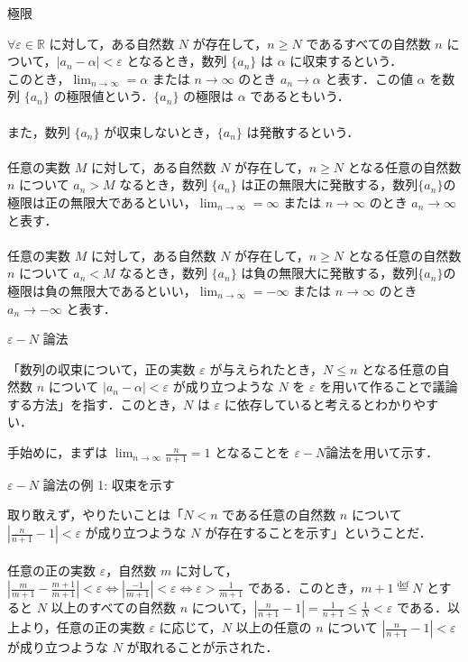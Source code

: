 \documentclass[a4paper]{ltjsarticle}
\begin{document}
\begin{tcb}{極限}{}

$\forall \varepsilon \in \mathbb{R}$ に対して，ある自然数 $N$ が存在して，$n \geq N$ であるすべての自然数 $n$ について，$|a_n - \alpha| < \varepsilon$ となるとき，数列 $\{a_n\}$ は $\alpha$ に収束するという．\\
このとき，$\lim_{n \to \infty} = \alpha$ または $n \to \infty$ のとき $a_n \to \alpha$ と表す．この値 $\alpha$ を数列 $\{a_n\}$ の極限値という．$\{a_n\}$ の極限は $\alpha$ であるともいう．\\
\\
また，数列 $\{a_n\}$ が収束しないとき，$\{a_n\}$ は発散するという．\\
\\
任意の実数 $M$ に対して，ある自然数 $N$ が存在して，$n \geq N$ となる任意の自然数 $n$ について $a_n > M$ なるとき，数列 $\{a_n\}$ は正の無限大に発散する，数列$\{a_n\}$の極限は正の無限大であるといい，$\lim_{n \to \infty} = \infty$ または $n \to \infty$ のとき $a_n \to \infty$ と表す．\\
\\
任意の実数 $M$ に対して，ある自然数 $N$ が存在して，$n \geq N$ となる任意の自然数 $n$ について $a_n < M$ なるとき，数列 $\{a_n\}$ は負の無限大に発散する，数列$\{a_n\}$の極限は負の無限大であるといい，$\lim_{n \to \infty} = -\infty$ または $n \to \infty$ のとき $a_n \to -\infty$ と表す．

\end{tcb}

\begin{tcb}{$\varepsilon - N$ 論法}{}

「数列の収束について，正の実数 $\varepsilon$ が与えられたとき，$N \leq n$ となる任意の自然数 $n$ について $|a_n - \alpha| < \varepsilon$ が成り立つような $N$ を $\varepsilon$ を用いて作ることで議論する方法」を指す．このとき，$N$ は $\varepsilon$ に依存していると考えるとわかりやすい． 

\end{tcb}
手始めに，まずは $\lim_{n \to \infty} \frac{n}{n + 1} = 1$ となることを $\varepsilon - N $論法を用いて示す． 

\begin{tcb}{$\varepsilon - N$ 論法の例 1: 収束を示す}{}

取り敢えず，やりたいことは「$N < n$ である任意の自然数 $n$ について $|\frac{n}{n + 1} - 1| < \varepsilon$ が成り立つような $N$ が存在することを示す」ということだ．
\\
\\
任意の正の実数 $\varepsilon$，自然数 $m$ に対して，$|\frac{m}{m + 1} - \frac{m + 1}{m + 1}| < \varepsilon \Leftrightarrow |\frac{-1}{m + 1}| < \varepsilon \Leftrightarrow  \varepsilon  > \frac{1}{m + 1}$ である．このとき，$m + 1 \stackrel{\mathrm{def}}{=} N$ とすると $N$ 以上のすべての自然数 $n$ について，$|\frac{n}{n + 1} - 1| = \frac{1}{n + 1} \leq \frac{1}{N} < \varepsilon$ である．以上より，任意の正の実数 $\varepsilon$ に応じて，$N$ 以上の任意の $n$ について $|\frac{n}{n + 1} - 1| < \varepsilon$ が成り立つような $N$ が取れることが示された．

\end{tcb}
\end{document}
